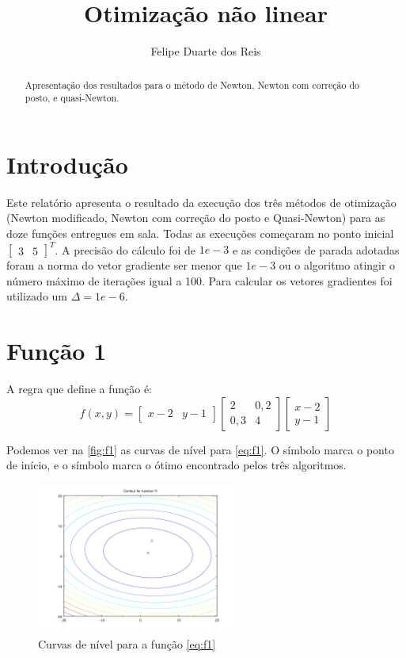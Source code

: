 \documentclass[12pt]{article}
\title{Otimização não linear}
\author{Felipe Duarte dos Reis}
\begin{document}
\maketitle

\begin{abstract}
Apresentação dos resultados para o método de Newton, Newton com correção do posto, e quasi-Newton.
\end{abstract}

\section{Introdução}
Este relatório apresenta o resultado da execução dos três métodos de otimização (Newton modificado, Newton com correção do posto e Quasi-Newton) para as 
doze funções entregues em sala. Todas as execuções começaram no ponto inicial $ \begin{bmatrix} 3 & 5 \end{bmatrix}^T $. A precisão do cálculo foi de $1e-3$ 
e as condições de parada adotadas foram a norma do vetor gradiente ser menor que $1e-3$ ou o algoritmo atingir o número máximo de iterações igual a 100. 
Para calcular os vetores gradientes foi utilizado um $\Delta = 1e-6$.

\section{Função 1}
A regra que define a função é:
\begin{equation}
\label{eq:f1}
f(x, y) = 
	   \begin{bmatrix}
            x - 2 & y - 1
           \end{bmatrix}            
           \begin{bmatrix}
	   2 	& 0,2 \\
	   0,3	& 4 
           \end{bmatrix} 
           \begin{bmatrix}
	   x - 2 \\
	   y - 1
           \end{bmatrix}
\end{equation}

Podemos ver na \autoref{fig:f1} as curvas de nível para \autoref{eq:f1}. O símbolo \textit{\textopenbullet} marca o ponto de início,
e o símbolo \textit{\texttimes} marca o ótimo encontrado pelos três algoritmos. 

\begin{figure}[H]
  \centering
  \includegraphics[width=250px]{../matlab/images/f1_contour}
  \caption{Curvas de nível para a função \autoref{eq:f1}}
  \label{fig:f1}
\end{figure}
\end{document}
